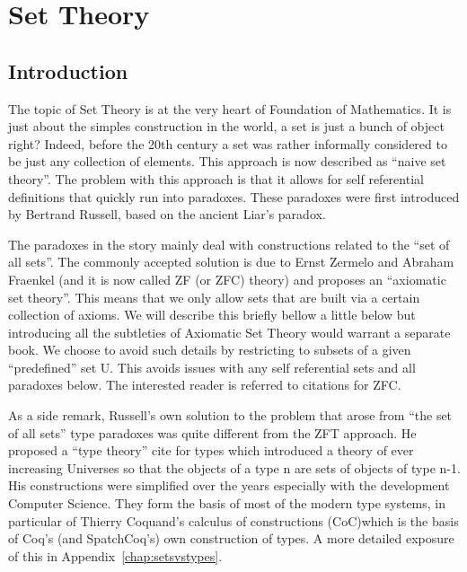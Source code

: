 \chapter{Set Theory}\label{ch:settheory}
\section{Introduction}

The topic of Set Theory is at the very heart of Foundation of Mathematics. It is just about the simples construction in the world, a set is just a bunch of object right? Indeed, before the 20th century a set was rather informally considered to be just any collection of elements. This approach is now described as ``naive set theory''. The problem with this approach is that it allows for self referential definitions that  quickly run into paradoxes.  These paradoxes were first introduced by Bertrand Russell, based on the ancient Liar's paradox.  

The paradoxes in the story mainly deal with constructions related to the ``set of all sets''. The commonly accepted solution is due to Ernst Zermelo and Abraham Fraenkel (and it is now called ZF (or ZFC) theory) and proposes an ``axiomatic set theory''. This means that we only allow sets that are built via a certain collection of axioms. We will describe this briefly bellow a little below but introducing all  the subtleties of Axiomatic Set Theory would warrant a separate book. We choose to avoid such details by restricting  to  subsets of a given ``predefined'' set U.  This avoids issues with any self referential sets and all paradoxes below. The interested reader is referred to {\color{red} citations for ZFC}.

As a side remark, Russell's own solution to the problem that arose from ``the set of all sets'' type paradoxes  was quite different from the ZFT  approach. He proposed a ``type theory'' {\color{red} cite for types} which introduced a theory of ever increasing Universes so that the objects of a type n are sets of objects of type n-1. His constructions were simplified over the years especially with the development Computer Science. They form the basis of most of the modern type systems, in particular of  Thierry Coquand's calculus of constructions (CoC)which is the basis of  Coq's (and SpatchCoq's) own construction of types.  A more detailed exposure of this in Appendix~\ref{chap:setsvstypes}.

